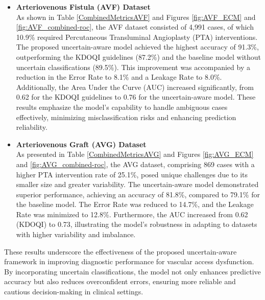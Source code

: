 \documentclass{ieeeaccess}
\begin{document}
\begin{itemize}
    \item \textbf{Arteriovenous Fistula (AVF) Dataset}\\
    As shown in Table \ref{CombinedMetricsAVF} and Figures \ref{fig:AVF_ECM} and \ref{fig:AVF_combined-roc}, the AVF dataset consisted of 4,991 cases, of which 10.9\% required Percutaneous Transluminal Angioplasty (PTA) interventions. The proposed uncertain-aware model achieved the highest accuracy of 91.3\%, outperforming the KDOQI guidelines (87.2\%) and the baseline model without uncertain classifications (89.5\%). This improvement was accompanied by a reduction in the Error Rate to 8.1\% and a Leakage Rate to 8.0\%. Additionally, the Area Under the Curve (AUC) increased significantly, from 0.62 for the KDOQI guidelines to 0.76 for the uncertain-aware model. These results emphasize the model's capability to handle ambiguous cases effectively, minimizing misclassification risks and enhancing prediction reliability.

    \item \textbf{Arteriovenous Graft (AVG) Dataset}\\
    As presented in Table \ref{CombinedMetricsAVG} and Figures \ref{fig:AVG_ECM} and \ref{fig:AVG_combined-roc}, the AVG dataset, comprising 869 cases with a higher PTA intervention rate of 25.1\%, posed unique challenges due to its smaller size and greater variability. The uncertain-aware model demonstrated superior performance, achieving an accuracy of 81.8\%, compared to 79.1\% for the baseline model. The Error Rate was reduced to 14.7\%, and the Leakage Rate was minimized to 12.8\%. Furthermore, the AUC increased from 0.62 (KDOQI) to 0.73, illustrating the model's robustness in adapting to datasets with higher variability and imbalance.

\end{itemize}

These results underscore the effectiveness of the proposed uncertain-aware framework in improving diagnostic performance for vascular access dysfunction. By incorporating uncertain classifications, the model not only enhances predictive accuracy but also reduces overconfident errors, ensuring more reliable and cautious decision-making in clinical settings.
\end{document}
